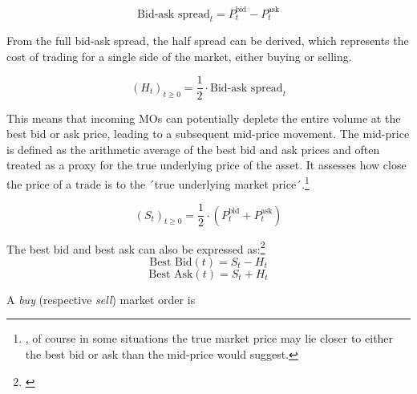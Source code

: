 \documentclass[12pt,a4paper]{cau_thesis}
\begin{document}
\begin{definition}
    \begin{equation}
        \text{Bid-ask spread}_{t} = P^{\text{bid}}_{t} - P^{\text{ask}}_{t}
    \end{equation}
    \label{def:bid_ask_spread}
\end{definition}
From the full bid-ask spread, the half spread can be derived, which
represents the cost of trading for a single side of the market, either
buying or selling.
\begin{definition}\label{def:half_spread}
    \begin{equation}
        {(H_{t})_{t \geqslant 0}} = \frac{1}{2} \cdot \text{Bid-ask spread}_{t}
    \end{equation}
\end{definition}

This means that incoming MOs can potentially deplete the entire
volume at the best bid or ask price, leading to a subsequent
mid-price movement. The mid-price is defined as the arithmetic
average of the best bid and ask prices and often treated as a proxy
for the true underlying price of the asset. It assesses how close the
price of a trade is to the ´true underlying market
price´.\footnote{\cite[See][, p.71]{cartea2015algorithmic}, of course
    in some situations the true market price may lie closer to either the
    best bid or ask than the mid-price would suggest.}

\begin{definition}\label{def:mid_price}
    \begin{equation}
        (S_{t})_{t \geqslant 0} = \frac{1}{2}\cdot(P^{\text{bid}}_{t} + P^{\text{ask}}_{t})
    \end{equation}
\end{definition}

The best bid and best ask can also be expressed
as:\footnote{\cite[See ][, p.80]{luckner2021hawkes}}
\begin{equation}\label{eq:best_bid_half_spread}
    \text{Best Bid}(t) = S_{t} - H_{t}
\end{equation}
\begin{equation}\label{eq:best_ask_half_spread}
    \text{Best Ask}(t) = S_{t} + H_{t}
\end{equation}

\begin{definition}
    A \textit{buy} (respective \textit{sell}) market order is
    \label{def:market_order}
\end{definition}
\end{document}
